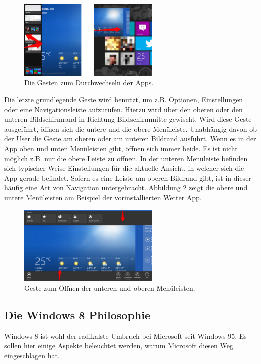 \documentclass[12pt,a4paper,bibtotoc,abstracton]{scrartcl}
\begin{document}
\begin{figure}[h]	
	\centering
	\includegraphics[width=0.6\textwidth]{Bilder/Screenshots/windows8/apps_changing.png} 
	\caption{Die Gesten zum Durchwechseln der Apps.}
	\label{fig:appschanging}
\end{figure}  

Die letzte grundlegende Geste wird benutzt, um z.B. Optionen, Einstellungen oder eine Navigationsleiste aufzurufen. Hierzu wird über den oberen oder den unteren Bildschirmrand in Richtung Bildschirmmitte gewischt. Wird diese Geste ausgeführt, öffnen sich die untere und die obere Menüleiste. Unabhängig davon ob der User die Geste am oberen oder am unteren Bildrand ausführt. Wenn es in der App oben und unten Menüleisten gibt, öffnen sich immer beide. Es ist nicht möglich z.B. nur die obere Leiste zu öffnen. In der unteren Menüleiste befinden sich typischer Weise Einstellungen für die aktuelle Ansicht, in welcher sich die App gerade befindet. Sofern es eine Leiste am oberen Bildrand gibt, ist in dieser häufig eine Art von Navigation untergebracht. Abbildung \ref{fig:menubar} zeigt die obere und untere Menüleisten am Beispiel der vorinstallierten Wetter App.

\begin{figure}[h]	
	\centering
	\includegraphics[width=0.6\textwidth]{Bilder/Screenshots/windows8/app_leisten.png} 
	\caption{Geste zum Öffnen der unteren und oberen Menüleisten.}
	\label{fig:menubar}
\end{figure}  

\subsection{Die Windows 8 Philosophie}
\label{subsec:win8philosophie}
Windows 8 ist wohl der radikalste Umbruch bei Microsoft seit Windows 95. Es sollen hier einige Aspekte beleuchtet werden, warum Microsoft diesen Weg eingeschlagen hat.
\end{document}
